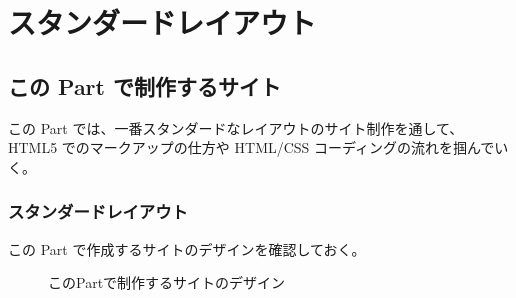 \part{スタンダードレイアウト}
\chapter{この Part で制作するサイト}
この Part では、一番スタンダードなレイアウトのサイト制作を通して、HTML5 でのマークアップの仕方や HTML/CSS コーディングの流れを掴んでいく。
\section{スタンダードレイアウト}
この Part で作成するサイトのデザインを確認しておく。
\vspc{-5.00pt}\begin{figure}[H]\centering{}\caption{このPartで制作するサイトのデザイン}\label{このPartで制作するサイトのデザイン}\end{figure}
